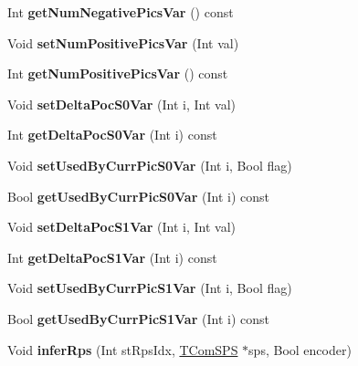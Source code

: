 \begin{DoxyCompactItemize}
\item 
\mbox{\label{class_t_com_st_ref_pic_set_ac1bf7744ec61b5ae320f9cb69cbf803d}} 
Int {\bfseries get\+Num\+Negative\+Pics\+Var} () const
\item 
\mbox{\label{class_t_com_st_ref_pic_set_a9fd032ba41946b30230864be3c2641d6}} 
Void {\bfseries set\+Num\+Positive\+Pics\+Var} (Int val)
\item 
\mbox{\label{class_t_com_st_ref_pic_set_ad2819ff27824ebd422b7fb2752e0336b}} 
Int {\bfseries get\+Num\+Positive\+Pics\+Var} () const
\item 
\mbox{\label{class_t_com_st_ref_pic_set_ad466476b9fb951960ac39dfd475260c8}} 
Void {\bfseries set\+Delta\+Poc\+S0\+Var} (Int i, Int val)
\item 
\mbox{\label{class_t_com_st_ref_pic_set_ab92ce43eace07cc263de279421268811}} 
Int {\bfseries get\+Delta\+Poc\+S0\+Var} (Int i) const
\item 
\mbox{\label{class_t_com_st_ref_pic_set_a338a2d0d0d6f7ff13e00ad05da45b0ca}} 
Void {\bfseries set\+Used\+By\+Curr\+Pic\+S0\+Var} (Int i, Bool flag)
\item 
\mbox{\label{class_t_com_st_ref_pic_set_aeb5a2fd7b7a004a64045fa9e0289f124}} 
Bool {\bfseries get\+Used\+By\+Curr\+Pic\+S0\+Var} (Int i) const
\item 
\mbox{\label{class_t_com_st_ref_pic_set_a8dc725401b65ed80288082d30db0c1ba}} 
Void {\bfseries set\+Delta\+Poc\+S1\+Var} (Int i, Int val)
\item 
\mbox{\label{class_t_com_st_ref_pic_set_a93fa3e3c62bb9dc533bbb5a3411b7ab5}} 
Int {\bfseries get\+Delta\+Poc\+S1\+Var} (Int i) const
\item 
\mbox{\label{class_t_com_st_ref_pic_set_a33b927e2f4720c5277b7249239e7eec5}} 
Void {\bfseries set\+Used\+By\+Curr\+Pic\+S1\+Var} (Int i, Bool flag)
\item 
\mbox{\label{class_t_com_st_ref_pic_set_ad8ab6285381edb1028730b10acbdf2bb}} 
Bool {\bfseries get\+Used\+By\+Curr\+Pic\+S1\+Var} (Int i) const
\item 
\mbox{\label{class_t_com_st_ref_pic_set_a6da658d4a345cbeb9b41d7dc95e5dbda}} 
Void {\bfseries infer\+Rps} (Int st\+Rps\+Idx, \hyperlink{class_t_com_s_p_s}{T\+Com\+S\+PS} $\ast$sps, Bool encoder)
\end{DoxyCompactItemize}


